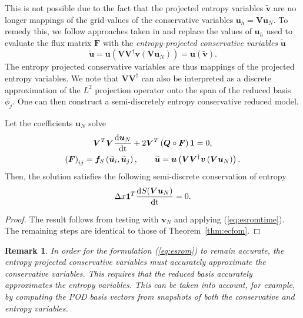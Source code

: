 \documentclass[review]{siamart171218}
\newtheorem*{remark}{Remark}
\theoremstyle{assumption}
\renewcommand{\tilde}{\widetilde}
\newcommand{\td}[2]{\frac{{\rm d}#1}{{\rm d}{\rm #2}}}
\newcommand{\LRp}[1]{\left( #1 \right)}
\begin{document}
This is not possible due to the fact that the projected entropy variables $\tilde{\bm{v}}$ are no longer mappings of the grid values of the conservative variables $\bm{u}_h = \bm{V}\bm{u}_N$.  To remedy this, we follow approaches taken in \cite{parsani2016entropy, chan2017discretely} and replace the values of ${\bm{u}_h}$ used to evaluate the flux matrix $\bm{F}$ with the \textit{entropy-projected conservative variables} $\tilde{\bm{u}}$
\[
\tilde{\bm{u}} = \bm{u}\LRp{\bm{V}\bm{V}^{\dagger}\bm{v}\LRp{\bm{V}\bm{u}_N}} = \bm{u}\LRp{\tilde{\bm{v}}}.
\]
The entropy projected conservative variables are thus mappings of the projected entropy variables.  We note that $\bm{V}\bm{V}^{\dagger}$ can also be interpreted as a discrete approximation of the $L^2$ projection operator onto the span of the reduced basis $\phi_j$. One can then construct a semi-discretely entropy conservative reduced model.
\begin{theorem} 
Let the coefficients $\bm{u}_N$ solve
\begin{gather}
\bm{V}^T\bm{V}\td{\bm{u}_N}{t} + 2\bm{V}^T\LRp{\bm{Q}\circ \bm{F}}\bm{1} = 0, \label{eq:esrom}\\
\LRp{\bm{F}}_{ij} = \bm{f}_S\LRp{\tilde{\bm{u}}_i,\tilde{\bm{u}}_j}, \qquad \tilde{\bm{u}} = \bm{u}\LRp{\bm{V}\bm{V}^{\dagger}\bm{v}\LRp{\bm{V}\bm{u}_N}}.\nonumber
\end{gather}
Then, the solution satisfies the following semi-discrete conservation of entropy
\[
\Delta x\bm{1}^T\td{S(\bm{V}\bm{u}_N)}{t} = 0.
\]
\label{thm:esrom}
\end{theorem}
\begin{proof}
The result follows from testing with $\bm{v}_N$ and applying (\ref{eq:esromtime}).  The remaining steps are identical to those of Theorem~\ref{thm:ecfom}.  
\end{proof}

\begin{remark}
In order for the formulation (\ref{eq:esrom}) to remain accurate, the entropy projected conservative variables must accurately approximate the conservative variables.  This requires that the reduced basis accurately approximates the entropy variables.  This can be taken into account, for example, by computing the POD basis vectors from snapshots of both the conservative and entropy variables.
\end{remark}
\end{document}
